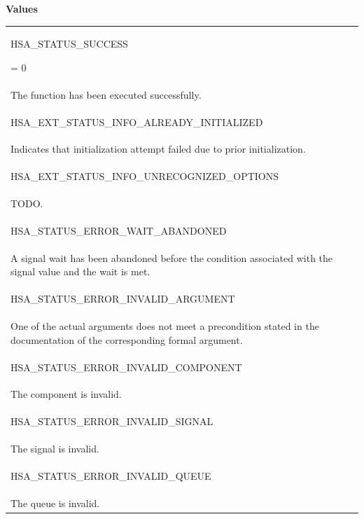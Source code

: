 \documentclass[final]{book}
\newcommand{\reftyp}[1]{#1}
\newcommand{\refenu}[1]{\reftyp{#1}}
\begin{document}
\noindent\textbf{Values}\\[-5mm]
\begin{longtable}{@{\hspace{2em}}p{\linewidth-2em}}
\hspace{-2em}\hypertarget{group__status_1ggad755322e7ff95456520e8abdbe90d225ae382ea0c9c05cce5a60d0317375159cc}{\refenu{HSA_STATUS_SUCCESS}} = 0\\The function has been executed successfully.\\[2mm]
\hspace{-2em}\hypertarget{group__status_1ggad755322e7ff95456520e8abdbe90d225a0882e3ebb9cc8a5c6033c43ee7a6d898}{\refenu{HSA_EXT_STATUS_INFO_ALREADY_INITIALIZED}} \\Indicates that initialization attempt failed due to prior initialization.\\[2mm]
\hspace{-2em}\hypertarget{group__status_1ggad755322e7ff95456520e8abdbe90d225a60343279bea68766b037297915b5f903}{\refenu{HSA_EXT_STATUS_INFO_UNRECOGNIZED_OPTIONS}} \\TODO.\\[2mm]
\hspace{-2em}\hypertarget{group__status_1ggad755322e7ff95456520e8abdbe90d225a3081a89b2b191a77f426b5697bca7360}{\refenu{HSA_STATUS_ERROR_WAIT_ABANDONED}} \\A signal wait has been abandoned before the condition associated with the signal value and the wait is met.\\[2mm]
\hspace{-2em}\hypertarget{group__status_1ggad755322e7ff95456520e8abdbe90d225ac7d3651f75107d2a6a8ba3b25683c030}{\refenu{HSA_STATUS_ERROR_INVALID_ARGUMENT}} \\One of the actual arguments does not meet a precondition stated in the documentation of the corresponding formal argument.\\[2mm]
\hspace{-2em}\hypertarget{group__status_1ggad755322e7ff95456520e8abdbe90d225ac136a6651d66e234971df5083600bbd0}{\refenu{HSA_STATUS_ERROR_INVALID_COMPONENT}} \\The component is invalid.\\[2mm]
\hspace{-2em}\hypertarget{group__status_1ggad755322e7ff95456520e8abdbe90d225a7b4c8c0d4c99a1fe966abc2d39b575fe}{\refenu{HSA_STATUS_ERROR_INVALID_SIGNAL}} \\The signal is invalid.\\[2mm]
\hspace{-2em}\hypertarget{group__status_1ggad755322e7ff95456520e8abdbe90d225aa3c762eb6a61b358702b45259d1686c4}{\refenu{HSA_STATUS_ERROR_INVALID_QUEUE}} \\The queue is invalid.\\[2mm]

\end{longtable}
\end{document}
